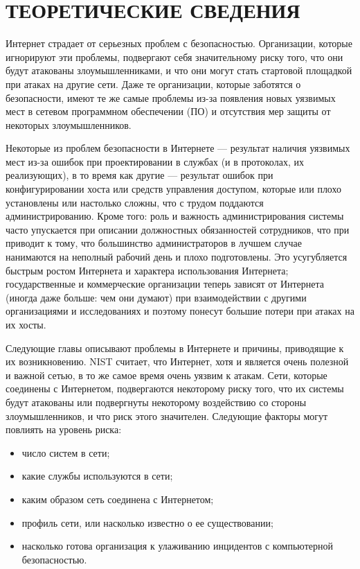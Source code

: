 \section{ТЕОРЕТИЧЕСКИЕ СВЕДЕНИЯ}

Интернет страдает от серьезных проблем с безопасностью. Организации,
которые игнорируют эти проблемы, подвергают себя значительному риску того,
что они будут атакованы злоумышленниками, и что они могут стать стартовой
площадкой при атаках на другие сети. Даже те организации,
которые заботятся о безопасности, имеют те же самые проблемы из-за появления
новых уязвимых мест в сетевом программном обеспечении (ПО) и отсутствия мер
защиты от некоторых злоумышленников.

Некоторые из проблем безопасности в Интернете --- результат наличия уязвимых
мест из-за ошибок при проектировании в службах (и в протоколах, их реализующих),
в то время как другие --- результат ошибок при конфигурировании хоста или
средств управления доступом, которые или плохо установлены или настолько сложны,
что с трудом поддаются администрированию. Кроме того: роль и важность администрирования
системы часто упускается при описании должностных обязанностей сотрудников,
что при приводит к тому, что большинство администраторов в лучшем случае
нанимаются на неполный рабочий день и плохо подготовлены.
Это усугубляется быстрым ростом Интернета и характера использования Интернета;
государственные и коммерческие организации теперь зависят от Интернета (иногда даже больше:
чем они думают) при взаимодействии с другими организациями и исследованиях
и поэтому понесут большие потери при атаках на их хосты.

Следующие главы описывают проблемы в Интернете и причины, приводящие к их возникновению.
NIST считает, что Интернет, хотя и является очень полезной и важной сетью,
в то же самое время очень уязвим к атакам. Сети, которые соединены с Интернетом,
подвергаются некоторому риску того, что их системы будут атакованы или
подвергнуты некоторому воздействию со стороны злоумышленников,
и что риск этого значителен. Следующие факторы могут повлиять на уровень риска:
\begin{itemize}
\item число систем в сети;
\item какие службы используются в сети;
\item каким образом сеть соединена с Интернетом;
\item профиль сети, или насколько известно о ее существовании;
\item насколько готова организация к улаживанию инцидентов с компьютерной безопасностью.
\end{itemize}

